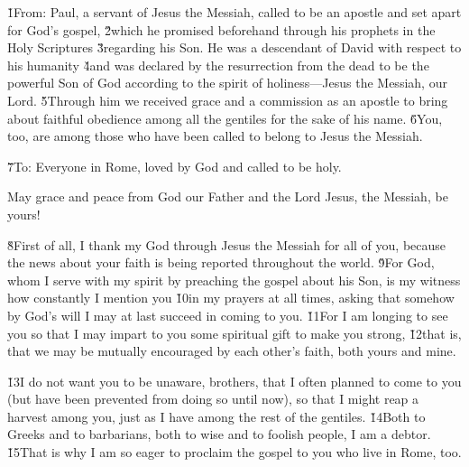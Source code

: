 


\v{1}From: Paul, a servant of Jesus the Messiah, called to be an apostle and set apart for God's gospel, \v{2}which he promised beforehand through his prophets in the Holy Scriptures \v{3}regarding his Son. He was a descendant of David with respect to his humanity \v{4}and was declared by the resurrection from the dead to be the powerful Son of God according to the spirit of holiness---Jesus the Messiah, our Lord. \v{5}Through him we received grace and a commission as an apostle to bring about faithful obedience among all the gentiles for the sake of his name. \v{6}You, too, are among those who have been called to belong to Jesus the Messiah.

\v{7}To: Everyone in Rome, loved by God and called to be holy.

May grace and peace from God our Father and the Lord Jesus, the Messiah, be yours!

\v{8}First of all, I thank my God through Jesus the Messiah for all of you, because the news about your faith is being reported throughout the world. \v{9}For God, whom I serve with my spirit by preaching the gospel about his Son, is my witness how constantly I mention you \v{10}in my prayers at all times, asking that somehow by God's will I may at last succeed in coming to you. \v{11}For I am longing to see you so that I may impart to you some spiritual gift to make you strong, \v{12}that is, that we may be mutually encouraged by each other's faith, both yours and mine.

\v{13}I do not want you to be unaware, brothers, that I often planned to come to you (but have been prevented from doing so until now), so that I might reap a harvest among you, just as I have among the rest of the gentiles. \v{14}Both to Greeks and to barbarians, both to wise and to foolish people, I am a debtor. \v{15}That is why I am so eager to proclaim the gospel to you who live in Rome, too.

